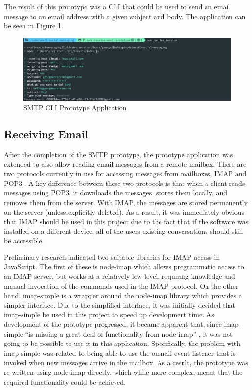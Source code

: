 The result of this prototype was a CLI that could be used to send an email message to an email address with a given subject and body. The application can be seen in Figure \ref{fig:smtp-cli}.

\begin{figure}[h!]
  \centering
  \includegraphics[width=\textwidth]{images/smtp-cli.png}
  \caption{SMTP CLI Prototype Application}
  \label{fig:smtp-cli}
\end{figure}

\subsection{Receiving Email}
After the completion of the SMTP prototype, the prototype application was extended to also allow reading email messages from a remote mailbox. There are two protocols currently in use for accessing messages from mailboxes, IMAP \cite{imap-rfc} and POP3 \cite{pop-rfc}. A key difference between these two protocols is that when a client reads messages using POP3, it downloads the messages, stores them locally, and removes them from the server. With IMAP, the messages are stored permanently on the server (unless explicitly deleted). As a result, it was immediately obvious that IMAP should be used in this project due to the fact that if the software was installed on a different device, all of the users existing conversations should still be accessible.

Preliminary research indicated two suitable libraries for IMAP access in JavaScript. The first of these is node-imap \cite{node-imap} which allows programmatic access to an IMAP server, but works at a relatively low-level, requiring knowledge and manual invocation of the commands used in the IMAP protocol. On the other hand, imap-simple \cite{imap-simple} is a wrapper around the node-imap library which provides a simpler interface. Due to the simplified interface, it was initially decided that imap-simple be used in this project to speed up development time. As development of the prototype progressed, it became apparent that, since imap-simple ``is missing a great deal of functionality from node-imap'' \cite{imap-simple}, it was not going to be possible to use it in this application. 
Specifically, the problem with imap-simple was related to being able to use the onmail event listener that is invoked when new messages arrive in the mailbox. As a result, the prototype was re-written using node-imap directly, which while more complex, meant that the required functionality could be achieved.

